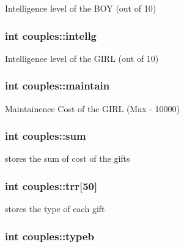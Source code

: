 Intelligence level of the B\-O\-Y (out of 10) 

\hypertarget{classcouples_a1c41f421dea55fb7f4eb45f6fb2e71d3}{
\subsubsection[{intellg}]{\setlength{\rightskip}{0pt plus 5cm}int couples\-::intellg}}\label{classcouples_a1c41f421dea55fb7f4eb45f6fb2e71d3}


Intelligence level of the G\-I\-R\-L (out of 10) 

\hypertarget{classcouples_a01f522776c66cb6a3f81fb8622d3398d}{
\subsubsection[{maintain}]{\setlength{\rightskip}{0pt plus 5cm}int couples\-::maintain}}\label{classcouples_a01f522776c66cb6a3f81fb8622d3398d}


Maintainence Cost of the G\-I\-R\-L (Max -\/ 10000) 

\hypertarget{classcouples_acf90278e6967e07c7d03686d4d389b43}{
\subsubsection[{sum}]{\setlength{\rightskip}{0pt plus 5cm}int couples\-::sum}}\label{classcouples_acf90278e6967e07c7d03686d4d389b43}


stores the sum of cost of the gifts 

\hypertarget{classcouples_a9096ebfd0783a26242329c9063c5b0f5}{
\subsubsection[{trr}]{\setlength{\rightskip}{0pt plus 5cm}int couples\-::trr\mbox{[}50\mbox{]}}}\label{classcouples_a9096ebfd0783a26242329c9063c5b0f5}


stores the type of each gift 

\hypertarget{classcouples_afabf41b3fd47b1e0183362508a2ff97d}{
\subsubsection[{typeb}]{\setlength{\rightskip}{0pt plus 5cm}int couples\-::typeb}}\label{classcouples_afabf41b3fd47b1e0183362508a2ff97d}


